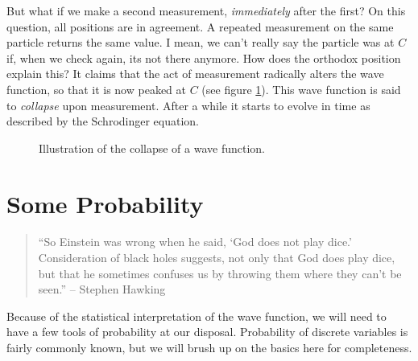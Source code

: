 \documentclass{article}
\begin{document}
But what if we make a second measurement, \emph{immediately} after the first? On this question, all positions are in agreement. A repeated measurement on the same particle returns the same value. I mean, we can't really say the particle was at $C$ if, when we check again, its not there anymore. How does the orthodox position explain this? It claims that the act of measurement radically alters the wave function, so that it is now peaked at $C$ (see figure \ref{2}). This wave function is said to \emph{collapse} upon measurement. After a while it starts to evolve in time as described by the Schrodinger equation.
\begin{figure}[h]
\caption{Illustration of the collapse of a wave function.}
\label{2}
\end{figure}
\section{Some Probability}
\begin{quote}
``So Einstein was wrong when he said, `God does not play dice.' Consideration of black holes suggests, not only that God does play dice, but that he sometimes confuses us by throwing them where they can't be seen.'' -- Stephen Hawking
\end{quote}
Because of the statistical interpretation of the wave function, we will need to have a few tools of probability at our disposal. Probability of discrete variables is fairly commonly known, but we will brush up on the basics here for completeness.
\end{document}
